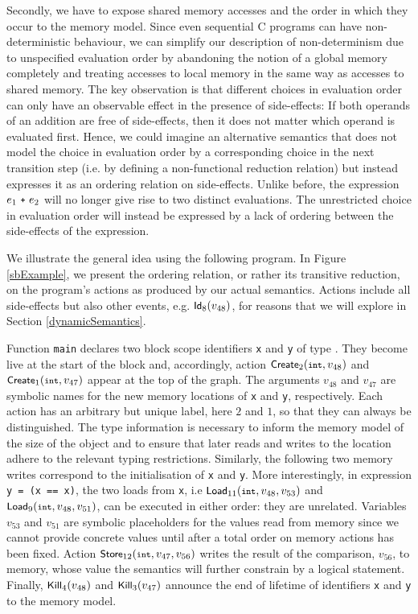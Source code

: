 \documentclass[a4paper,12pt]{scrbook}
\theoremstyle{plain}
\theoremstyle{definition}
\newcommand{\sem}[1]{{\small{\textsf{#1}}}}
\newcommand{\cc}[1]{{\text{\footnotesize\ttfamily{#1}}}}
\begin{document}
Secondly, we have to expose shared memory accesses and the order in which they
occur to the memory model. Since even sequential C programs can have
non-deterministic behaviour, we can simplify our description of non-determinism
due to unspecified evaluation order by abandoning the notion of a global memory
completely and treating accesses to local memory in the same way as accesses to
shared memory. The key observation is that different choices in evaluation order
can only have an observable effect in the presence of side-effects: If both
operands of an addition are free of side-effects, then it does not matter which
operand is evaluated first. Hence, we could imagine an alternative semantics
that does not model the choice in evaluation order by a corresponding choice in
the next transition step (i.e. by defining a non-functional reduction relation)
but instead expresses it as an ordering relation on side-effects.  Unlike
before, the expression $e_1 ~\cc{+}~ e_2$ will no longer give rise to two
distinct evaluations. The unrestricted choice in evaluation order will instead
be expressed by a lack of ordering between the side-effects of the expression.

We illustrate the general idea using the following
program.  In Figure
\ref{sbExample}, we present the ordering relation, or rather its transitive
reduction, on the program's actions as produced by our actual semantics. Actions
include all side-effects but also other events, e.g. $\sem{Id}_8(v_{48})$, for
reasons that we will explore in Section \ref{dynamicSemantics}.

Function \lstinline{main} declares two block scope identifiers \lstinline{x} and
\lstinline{y} of type \cc{int}. They become live at the start of the block and,
accordingly, action $\sem{Create}_2(\cc{int}, v_{48})$ and
$\sem{Create}_1(\cc{int}, v_{47})$ appear at the top of the graph. The arguments
$v_{48}$ and $v_{47}$ are symbolic names for the new memory locations of
\lstinline{x} and \lstinline{y}, respectively. Each action has an arbitrary but
unique label, here $2$ and $1$, so that they can always be distinguished. The
type information is necessary to inform the memory model of the size of the
object and to ensure that later reads and writes to the location adhere to the
relevant typing restrictions. Similarly, the following two memory writes
correspond to the initialisation of \lstinline{x} and \lstinline{y}. More
interestingly, in expression \lstinline{y = (x == x)}, the two loads from
\lstinline{x}, i.e $\sem{Load}_{11}(\cc{int}, v_{48}, v_{53})$ and
$\sem{Load}_{9}(\cc{int}, v_{48}, v_{51})$, can be executed in either order:
they are unrelated. Variables $v_{53}$ and $v_{51}$ are symbolic placeholders
for the values read from memory since we cannot provide concrete values until
after a total order on memory actions has been fixed. Action
$\sem{Store}_{12}(\cc{int}, v_{47}, v_{56})$ writes the result of the
comparison, $v_{56}$, to memory, whose value the semantics will further
constrain by a logical statement. Finally, $\sem{Kill}_4(v_{48})$ and
$\sem{Kill}_3(v_{47})$ announce the end of lifetime of identifiers \lstinline{x}
and \lstinline{y} to the memory model.
\end{document}
